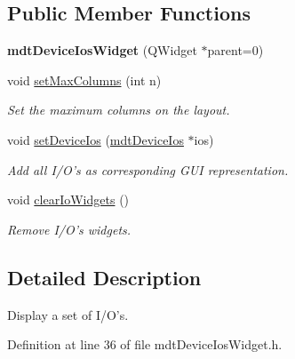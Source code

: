 \subsection*{Public Member Functions}
\begin{DoxyCompactItemize}
\item 
\hypertarget{classmdt_device_ios_widget_affd43c16896f0191038911231b52a1fd}{
{\bfseries mdtDeviceIosWidget} (QWidget $\ast$parent=0)}
\label{classmdt_device_ios_widget_affd43c16896f0191038911231b52a1fd}

\item 
void \hyperlink{classmdt_device_ios_widget_ad388c95b2bdb48bae976c3fbc2512c30}{setMaxColumns} (int n)
\begin{DoxyCompactList}\small\item\em Set the maximum columns on the layout. \end{DoxyCompactList}\item 
void \hyperlink{classmdt_device_ios_widget_a8fc261333ffc1c3b705ae8609f687159}{setDeviceIos} (\hyperlink{classmdt_device_ios}{mdtDeviceIos} $\ast$ios)
\begin{DoxyCompactList}\small\item\em Add all I/O's as corresponding GUI representation. \end{DoxyCompactList}\item 
\hypertarget{classmdt_device_ios_widget_af5183009a724c9e8f17cb428fc98b85f}{
void \hyperlink{classmdt_device_ios_widget_af5183009a724c9e8f17cb428fc98b85f}{clearIoWidgets} ()}
\label{classmdt_device_ios_widget_af5183009a724c9e8f17cb428fc98b85f}

\begin{DoxyCompactList}\small\item\em Remove I/O's widgets. \end{DoxyCompactList}\end{DoxyCompactItemize}


\subsection{Detailed Description}
Display a set of I/O's. 

Definition at line 36 of file mdtDeviceIosWidget.h.



